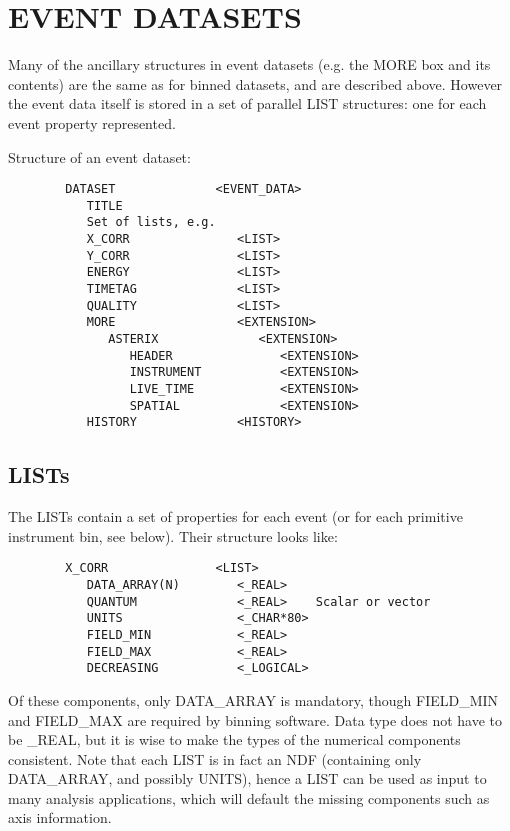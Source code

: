 \section{EVENT DATASETS}

Many of the ancillary structures in event datasets (e.g.  the MORE box
and  its  contents)  are  the  same  as  for  binned datasets, and are
described above.  However the event data itself is stored in a set  of
parallel LIST structures:  one for each event property represented.

Structure of an event dataset:

\begin{verbatim}
        DATASET              <EVENT_DATA>
           TITLE
           Set of lists, e.g.
           X_CORR               <LIST>
           Y_CORR               <LIST>
           ENERGY               <LIST>
           TIMETAG              <LIST>
           QUALITY              <LIST>
           MORE                 <EXTENSION>
              ASTERIX              <EXTENSION>
                 HEADER               <EXTENSION>
                 INSTRUMENT           <EXTENSION>
                 LIVE_TIME            <EXTENSION>
                 SPATIAL              <EXTENSION>
           HISTORY              <HISTORY>
\end{verbatim}

\subsection{LISTs}

The LISTs contain a set of properties for  each  event  (or  for  each
primitive instrument bin, see below).  Their structure looks like:

\begin{verbatim}
        X_CORR               <LIST>
           DATA_ARRAY(N)        <_REAL>
           QUANTUM              <_REAL>    Scalar or vector
           UNITS                <_CHAR*80>
           FIELD_MIN            <_REAL>
           FIELD_MAX            <_REAL>
           DECREASING           <_LOGICAL>
\end{verbatim}

Of these components, only DATA\_ARRAY is  mandatory,  though  FIELD\_MIN
and  FIELD\_MAX  are  required by binning software.  Data type does not
have to be \_REAL, but it is wise to make the types  of  the  numerical
components  consistent.   Note  that  each  LIST  is  in  fact  an NDF
(containing only DATA\_ARRAY, and possibly UNITS), hence a LIST can  be
used  as  input  to many analysis applications, which will default the
missing components such as axis information.


